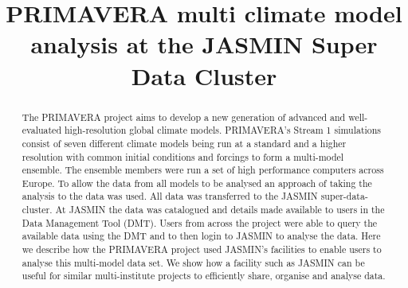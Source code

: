 \documentclass[gmd, manuscript]{copernicus}
\begin{document}
\title{PRIMAVERA multi climate model analysis at the JASMIN Super Data Cluster}













\received{}
\pubdiscuss{} %
\revised{}
\accepted{}
\published{}




\maketitle



\begin{abstract}
The PRIMAVERA project aims to develop a new generation of advanced and well-evaluated high-resolution global climate models. PRIMAVERA's Stream 1 simulations consist of seven different climate models being run at a standard and a higher resolution with common initial conditions and forcings to form a multi-model ensemble. The ensemble members were run a set of high performance computers across Europe. To allow the data from all models to be analysed an approach of taking the analysis to the data was used. All data was transferred to the JASMIN super-data-cluster. At JASMIN the data was catalogued and details made available to users in the Data Management Tool (DMT). Users from across the project were able to query the available data using the DMT and to then login to JASMIN to analyse the data. Here we describe how the PRIMAVERA project used JASMIN's facilities to enable users to analyse this multi-model data set. We show how a facility such as JASMIN can be useful for similar multi-institute projects to efficiently share, organise and analyse data.
\end{abstract}
\end{document}
